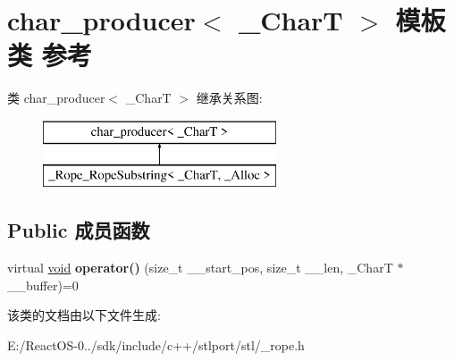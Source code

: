 \hypertarget{classchar__producer}{}\section{char\+\_\+producer$<$ \+\_\+\+CharT $>$ 模板类 参考}
\label{classchar__producer}
类 char\+\_\+producer$<$ \+\_\+\+CharT $>$ 继承关系图\+:\begin{figure}[H]
\begin{center}
\leavevmode
\includegraphics[height=2.000000cm]{classchar__producer}
\end{center}
\end{figure}
\subsection*{Public 成员函数}
\begin{DoxyCompactItemize}
\item 
\mbox{\label{classchar__producer_a05c23d2619e25bff565f297ca2b397b7}} 
virtual \hyperlink{interfacevoid}{void} {\bfseries operator()} (size\+\_\+t \+\_\+\+\_\+start\+\_\+pos, size\+\_\+t \+\_\+\+\_\+len, \+\_\+\+CharT $\ast$\+\_\+\+\_\+buffer)=0
\end{DoxyCompactItemize}


该类的文档由以下文件生成\+:\begin{DoxyCompactItemize}
\item 
E\+:/\+React\+O\+S-\/0../sdk/include/c++/stlport/stl/\+\_\+rope.\+h\end{DoxyCompactItemize}
